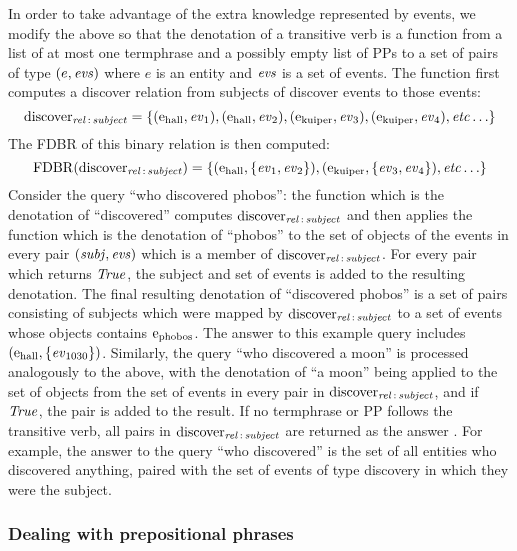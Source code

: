 \documentclass[../main.tex]{subfiles}
\begin{document}
\begin{refsection}
In order to take advantage of the extra knowledge represented by events, we modify the above so
that the denotation of a transitive verb is a function from a list of at most one termphrase and a possibly empty list of PPs to a set of pairs of type $(e,\operatorname{\mathit{evs}})$ where $e$ is an entity and $\operatorname{\mathit{evs}}$ is a set of events.
The function first computes a discover relation from subjects of discover events to those events:
\begin{equation*}
	\operatorname{discover}_{\operatorname{\mathit{rel}}\,:\,\operatorname{\mathit{subject}}} = \{ (\mathrm{e}_{\operatorname{hall}}, \operatorname{\mathit{ev}}_{1}), (\mathrm{e}_{\operatorname{hall}}, \operatorname{\mathit{ev}}_{2}), (\mathrm{e}_{\operatorname{kuiper}}, \operatorname{\mathit{ev}}_{3}), (\mathrm{e}_{\operatorname{kuiper}}, \operatorname{\mathit{ev}}_{4}), \operatorname{\mathit{etc\ldots}} \}
\end{equation*}
The FDBR of this binary relation is then computed:
\begin{equation*}
	\operatorname{FDBR}({\operatorname{discover}_{\operatorname{\mathit{rel}}\,:\,\operatorname{\mathit{subject}}}}) = \{(\mathrm{e}_{\operatorname{hall}}, \{\operatorname{\mathit{ev}}_{1}, \operatorname{\mathit{ev}}_{2}\}), (\mathrm{e}_{\operatorname{kuiper}}, \{\operatorname{\mathit{ev}}_{3}, \operatorname{\mathit{ev}}_{4}\}), \operatorname{\mathit{etc\ldots}} \}
\end{equation*}
Consider the query ``who discovered phobos'': the function which is the denotation
of ``discovered'' computes $\operatorname{discover}_{\operatorname{\mathit{rel}}\,:\,\operatorname{\mathit{subject}}}$ and then applies the function which is the
denotation of ``phobos'' to the set of objects of the events in every pair $(\operatorname{\mathit{subj}},\operatorname{\mathit{evs}})$ which is a
member of $\operatorname{discover}_{\operatorname{\mathit{rel}}\,:\,\operatorname{\mathit{subject}}}$. For every pair which returns $\operatorname{\mathit{True}}$, the subject and set of events is
added to the resulting denotation. The final resulting denotation of
``discovered phobos'' is a set of pairs consisting of subjects which were mapped by
$\operatorname{discover}_{\operatorname{\mathit{rel}}\,:\,\operatorname{\mathit{subject}}}$ to a set of events whose objects contains $\mathrm{e}_{\operatorname{phobos}}$. The answer to this example query includes $(\mathrm{e}_{\operatorname{hall}}, \{\operatorname{\mathit{ev}}_{1030}\})$. Similarly, the query ``who
discovered a moon'' is processed analogously to the above, with the denotation of ``a moon''
being applied to the set of objects from the set of events in every pair in $\operatorname{discover}_{\operatorname{\mathit{rel}}\,:\,\operatorname{\mathit{subject}}}$,
and if $\operatorname{\mathit{True}}$, the pair is added to the result.
If no termphrase or PP follows the transitive verb, all pairs in $\operatorname{discover}_{\operatorname{\mathit{rel}}\,:\,\operatorname{\mathit{subject}}}$
are returned as the answer . For example, the answer to the query ``who discovered'' is the set of
all entities who discovered anything, paired with the set of events of type discovery in which
they were the subject.

\subsubsection{Dealing with prepositional phrases}


\end{refsection}
\end{document}
